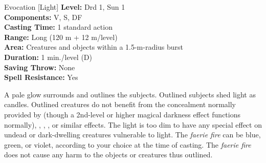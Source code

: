 {Evocation [Light]}
{
	\textbf{Level:}
	Drd 1, Sun 1\\
	\textbf{Components:}
	V, S, DF\\
	\textbf{Casting Time:}
	1 standard action\\
	\textbf{Range:}
	Long (120 m + 12 m/level)\\
	\textbf{Area:}
	Creatures and objects within a 1.5-m-radius burst\\
	\textbf{Duration:}
	1 min./level (D)\\
	\textbf{Saving Throw:}
	None\\
	\textbf{Spell Resistance:}
	Yes\\
}
{
	A pale glow surrounds and outlines the subjects. Outlined subjects shed light as candles. Outlined creatures do not benefit from the concealment normally provided by  (though a 2nd-level or higher magical darkness effect functions normally), , , , or similar effects. The light is too dim to have any special effect on undead or dark-dwelling creatures vulnerable to light. The \emph{faerie fire} can be blue, green, or violet, according to your choice at the time of casting. The \emph{faerie fire} does not cause any harm to the objects or creatures thus outlined.

}
